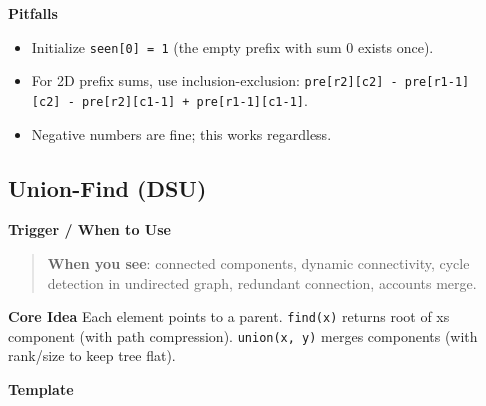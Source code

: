 \documentclass[11pt]{article}
\providecommand{\tightlist}{\setlength{\itemsep}{1pt}\setlength{\parskip}{0pt}}
\begin{document}
\textbf{Pitfalls}

\begin{itemize}
\tightlist
\item
  Initialize \texttt{seen{[}0{]}\ =\ 1} (the empty prefix with sum 0 exists once).
\item
  For 2D prefix sums, use inclusion-exclusion: \texttt{pre{[}r2{]}{[}c2{]}\ -\ pre{[}r1-1{]}{[}c2{]}\ -\ pre{[}r2{]}{[}c1-1{]}\ +\ pre{[}r1-1{]}{[}c1-1{]}}.
\item
  Negative numbers are fine; this works regardless.
\end{itemize}

\subsection{Union-Find (DSU)}\label{union-find-dsu}

\textbf{Trigger / When to Use}

\begin{quote}
\textbf{When you see}: connected components, dynamic connectivity, cycle detection in undirected graph, redundant connection, accounts merge.
\end{quote}

\textbf{Core Idea}
Each element points to a parent. \texttt{find(x)} returns root of x\textquotesingle s component (with path compression). \texttt{union(x,\ y)} merges components (with rank/size to keep tree flat).

\textbf{Template}

\end{document}
